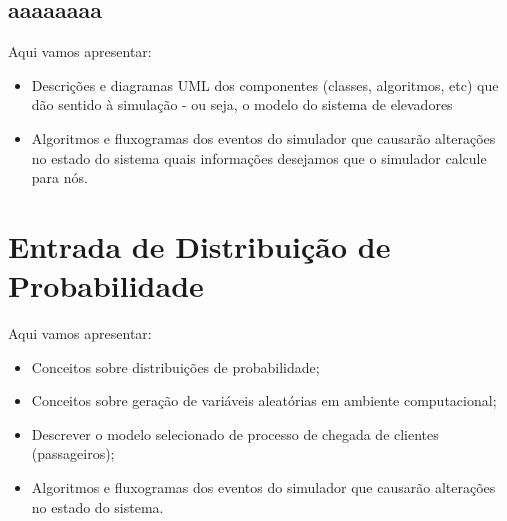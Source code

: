 \subsection{aaaaaaaa}

Aqui vamos apresentar:

\begin{itemize}
  \item Descrições e diagramas UML dos componentes (classes, algoritmos, etc)
que dão sentido à simulação - ou seja, o modelo do sistema de elevadores
  \item Algoritmos e fluxogramas dos eventos do simulador que causarão
alterações no estado do sistema quais informações desejamos que o simulador
calcule para nós.
\end{itemize}

\section{\label{chap:input}Entrada de Distribuição de Probabilidade}

Aqui vamos apresentar:

\begin{itemize}
\item Conceitos sobre distribuições de probabilidade;
\item Conceitos sobre geração de variáveis aleatórias em ambiente computacional;
\item Descrever o modelo selecionado de processo de chegada de clientes
(passageiros);
\item Algoritmos e fluxogramas dos eventos do simulador que causarão alterações
no estado do sistema.
\end{itemize}
